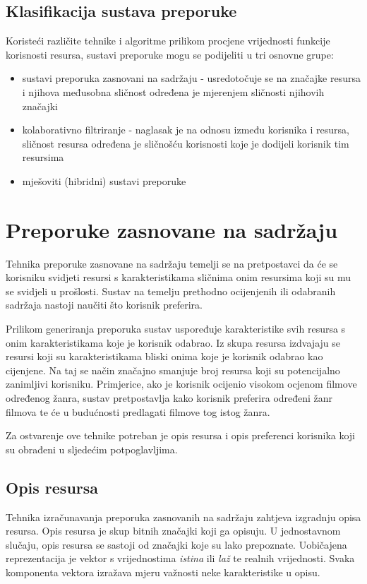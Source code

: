\documentclass[times, utf8, seminar]{fer}
\begin{document}
\section{Klasifikacija sustava preporuke}
Koristeći različite tehnike i algoritme prilikom procjene vrijednosti funkcije korisnosti resursa, sustavi preporuke mogu se podijeliti u tri osnovne grupe:
\begin{itemize}
	\item sustavi preporuka zasnovani na sadržaju  - usredotočuje se na značajke resursa i njihova međusobna sličnost određena je mjerenjem sličnosti njihovih značajki
	\item kolaborativno filtriranje  - naglasak je na odnosu između korisnika i resursa, sličnost resursa određena je sličnošću korisnosti koje je dodijeli korisnik tim resursima
	\item mješoviti (hibridni) sustavi preporuke
\end{itemize}

\chapter{Preporuke zasnovane na sadržaju}
Tehnika preporuke zasnovane na sadržaju temelji se na pretpostavci da će se korisniku svidjeti resursi s karakteristikama sličnima onim resursima koji su mu se svidjeli u prošlosti. Sustav na temelju prethodno ocijenjenih ili odabranih sadržaja nastoji naučiti što korisnik preferira. 

Prilikom generiranja preporuka sustav uspoređuje karakteristike svih resursa s onim karakteristikama koje je korisnik odabrao. Iz skupa resursa izdvajaju se resursi koji su karakteristikama bliski onima koje je korisnik odabrao kao cijenjene. Na taj se način značajno smanjuje broj resursa koji su potencijalno zanimljivi korisniku. 
Primjerice, ako je korisnik ocijenio visokom ocjenom filmove određenog žanra, sustav pretpostavlja kako korisnik preferira određeni žanr filmova te će u budućnosti predlagati filmove tog istog žanra.

Za ostvarenje ove tehnike potreban je opis resursa  i opis preferenci korisnika  koji su obrađeni u sljedećim potpoglavljima.

\section{Opis resursa}
Tehnika izračunavanja preporuka zasnovanih na sadržaju zahtjeva izgradnju opisa resursa. Opis resursa je skup bitnih značajki koji ga opisuju. U jednostavnom slučaju, opis resursa se sastoji od značajki koje su lako prepoznate. Uobičajena reprezentacija je vektor s vrijednostima \textit{istina} ili \textit{laž} te realnih vrijednosti. Svaka komponenta vektora izražava mjeru važnosti neke karakteristike u opisu.
\end{document}
